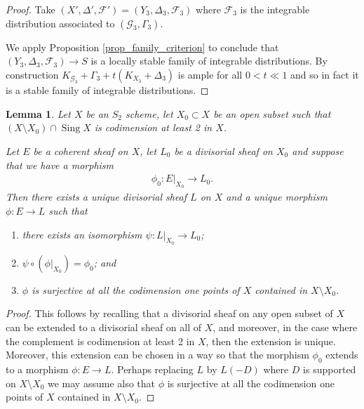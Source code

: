 \documentclass[12pt, a4paper]{amsart}
\DeclareMathOperator{\sing}{Sing}
\newtheorem{lemma}[theorem]{Lemma}
\theoremstyle{definition}
\theoremstyle{named}
\begin{document}
\begin{proof}
Take $(X', \Delta', \mathcal F') = (Y_3, \Delta_3, \mathcal F_3)$ where $\mathcal F_3$ is the integrable distribution associated to $(\mathcal G_3, \Gamma_3)$.


We apply Proposition \ref{prop_family_criterion}
to conclude that $(Y_3, \Delta_3, \mathcal F_3) \rightarrow S$
is a locally stable family 
of integrable distributions.
By construction $K_{\mathcal G_3}+\Gamma_3+t(K_{X_3}+\Delta_3)$
is ample for all $0<t \ll 1$ and so in fact 
it is a stable family of integrable distributions.
\end{proof}


\begin{lemma}
\label{lem_unique_extension}
    Let $X$ be an $S_2$ scheme, let $X_0 \subset X$ be an open subset such that
    $(X \setminus X_0) \cap \sing X$ is 
    codimension at least 2 in $X$.

Let $E$ be a coherent sheaf on $X$, let $L_0$ be a divisorial sheaf on $X_0$ and suppose that we have a morphism 
\begin{align*}\phi_0\colon E\vert_{X_0} \rightarrow L_0.\end{align*}
Then there exists a unique divisorial sheaf $L$ on $X$
and a unique morphism $\phi\colon E \rightarrow L$
such that 
\begin{enumerate}
    \item there exists an isomorphism $\psi\colon L\vert_{X_0} \rightarrow L_0$;
    \item $\psi\circ (\phi\vert_{X_0}) = \phi_0$; and 
    \item $\phi$ is surjective at all the codimension one points of $X$ contained in $X \setminus X_0$.
\end{enumerate}
\end{lemma}
\begin{proof}
This follows by recalling that a divisorial sheaf on any open subset of $X$ can be extended to a divisorial sheaf on all of $X$, and moreover, in the case where the complement is codimension at least 2 in $X$, then the extension is unique.  Moreover, this extension can be chosen in a way so that the morphism $\phi_0$
extends to a morphism $\phi\colon E \to L$.  Perhaps replacing $L$ by $L(-D)$ where $D$ is supported on $X \setminus X_0$ we may assume also that $\phi$ is surjective at all the codimension one points of $X$ contained in $X \setminus X_0$.
\end{proof}



 
\end{document}
